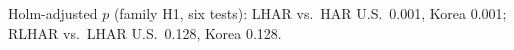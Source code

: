 Holm-adjusted $p$ (family H1, six tests): LHAR vs.\ HAR U.S.\ 0.001, Korea 0.001; RLHAR vs.\ LHAR U.S.\ 0.128, Korea 0.128.